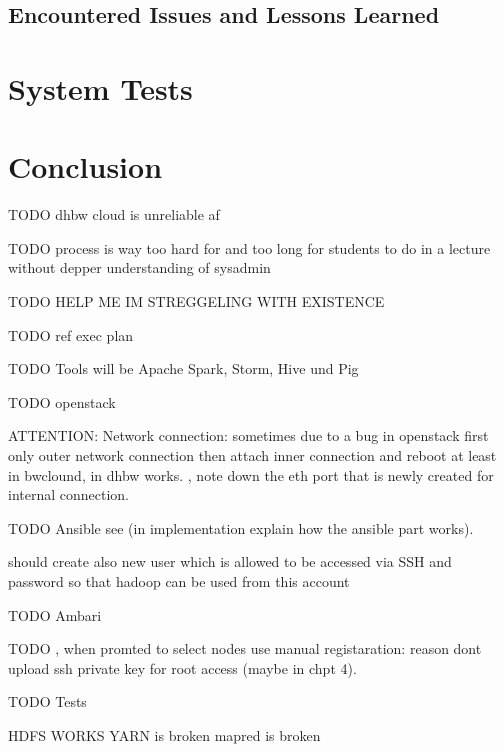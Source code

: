 \subsection{Encountered Issues and Lessons Learned}

\section{System Tests}

\section{Conclusion}

TODO dhbw cloud is unreliable af

TODO process is way too hard for and too long for students to do in a lecture without depper understanding of sysadmin  



TODO HELP ME IM STREGGELING WITH EXISTENCE



TODO ref exec plan

TODO Tools will be Apache Spark, Storm, Hive und Pig

TODO openstack

    ATTENTION: Network connection: sometimes due to a bug in openstack first only outer network connection then attach inner connection and reboot at least in bwclound, in dhbw works. 
    , note down the eth port that is newly created for internal connection.
    


TODO Ansible
see 
     (in implementation explain how the ansible part works). 
     
     should create also new user which is allowed to be accessed via SSH and  password so that hadoop can be used from this account

TODO Ambari

    TODO ,  when promted to select nodes use manual registaration: reason dont upload ssh private key for root access (maybe in chpt 4).

TODO Tests

HDFS WORKS
YARN is broken
mapred is broken


